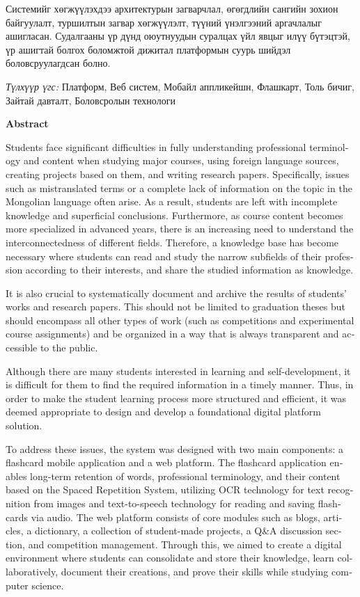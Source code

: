 Системийг хөгжүүлэхдээ архитектурын загварчлал, өгөгдлийн сангийн зохион байгуулалт, туршилтын загвар хөгжүүлэлт, түүний үнэлгээний аргачлалыг ашигласан. Судалгааны үр дүнд оюутнуудын суралцах үйл явцыг илүү бүтэцтэй, үр ашигтай болгох боломжтой дижитал платформын суурь шийдэл боловсруулагдсан болно.

\vspace{3mm}
\textit{Түлхүүр үгс:} Платформ, Веб систем, Мобайл аппликейшн, Флашкарт, Толь бичиг, Зайтай давталт, Боловсролын технологи

\vspace{10mm}
\newpage
\begin{center}
\textbf{\large Abstract}
\end{center}

\begin{english}

Students face significant difficulties in fully understanding professional terminology and content when studying major courses, using foreign language sources, creating projects based on them, and writing research papers. Specifically, issues such as mistranslated terms or a complete lack of information on the topic in the Mongolian language often arise. As a result, students are left with incomplete knowledge and superficial conclusions. Furthermore, as course content becomes more specialized in advanced years, there is an increasing need to understand the interconnectedness of different fields. Therefore, a knowledge base has become necessary where students can read and study the narrow subfields of their profession according to their interests, and share the studied information as knowledge.

It is also crucial to systematically document and archive the results of students' works and research papers. This should not be limited to graduation theses but should encompass all other types of work (such as competitions and experimental course assignments) and be organized in a way that is always transparent and accessible to the public.

Although there are many students interested in learning and self-development, it is difficult for them to find the required information in a timely manner. Thus, in order to make the student learning process more structured and efficient, it was deemed appropriate to design and develop a foundational digital platform solution.

To address these issues, the system was designed with two main components: a flashcard mobile application and a web platform. The flashcard application enables long-term retention of words, professional terminology, and their content based on the Spaced Repetition System, utilizing OCR technology for text recognition from images and text-to-speech technology for reading and saving flashcards via audio. The web platform consists of core modules such as blogs, articles, a dictionary, a collection of student-made projects, a Q\&A discussion section, and competition management. Through this, we aimed to create a digital environment where students can consolidate and store their knowledge, learn collaboratively, document their creations, and prove their skills while studying computer science.


\end{english}
